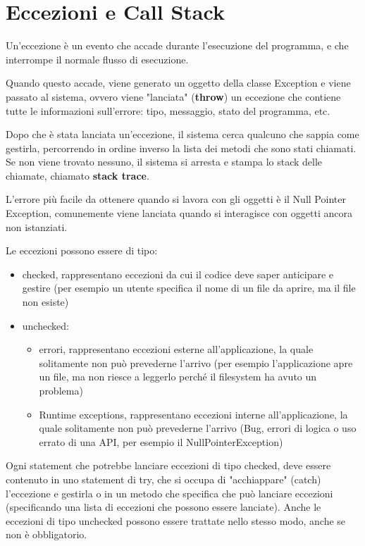 \documentclass[a4paper,12pt,twoside]{book}
\begin{document}
\section{Eccezioni e Call Stack}

Un'eccezione è un evento che accade durante l’esecuzione del
programma, e che interrompe il normale flusso di esecuzione.  

Quando questo accade, viene generato un oggetto della classe Exception
e viene passato al sistema, ovvero viene "lanciata" (\textbf{throw}) un
eccezione che contiene tutte le informazioni sull’errore: tipo,
messaggio, stato del programma, etc.

Dopo che è stata lanciata un’eccezione, il sistema cerca qualcuno che
sappia come gestirla, percorrendo in ordine inverso la lista dei
metodi che sono stati chiamati. Se non viene trovato nessuno, il
sistema si arresta e stampa lo stack delle chiamate, chiamato \textbf{stack
  trace}.

L'errore più facile da ottenere quando si lavora con gli oggetti è il
Null Pointer Exception, comunemente viene lanciata quando si
interagisce con oggetti ancora non istanziati.

Le eccezioni possono essere di tipo:
\begin{itemize}
\item checked, rappresentano eccezioni da cui il codice deve saper
  anticipare e gestire (per esempio un utente specifica il nome di un
  file da aprire, ma il file non esiste)
\item unchecked:
  \begin{itemize}
  \item errori, rappresentano eccezioni esterne all’applicazione, la
    quale solitamente non può prevederne l’arrivo (per esempio
    l’applicazione apre un file, ma non riesce a leggerlo perché il
    filesystem ha avuto un problema)
  \item Runtime exceptions, rappresentano eccezioni interne
    all’applicazione, la quale solitamente non può prevederne l’arrivo
    (Bug, errori di logica o uso errato di una API, per esempio il
    NullPointerException)
  \end{itemize}
\end{itemize}

Ogni statement che potrebbe lanciare eccezioni di tipo checked, deve
essere contenuto in uno statement di try, che si occupa di
"acchiappare" (catch) l’eccezione e gestirla o in un metodo che
specifica che può lanciare eccezioni (specificando una lista di
eccezioni che possono essere lanciate). Anche le eccezioni di tipo
unchecked possono essere trattate nello stesso modo, anche se non è
obbligatorio.
\end{document}
